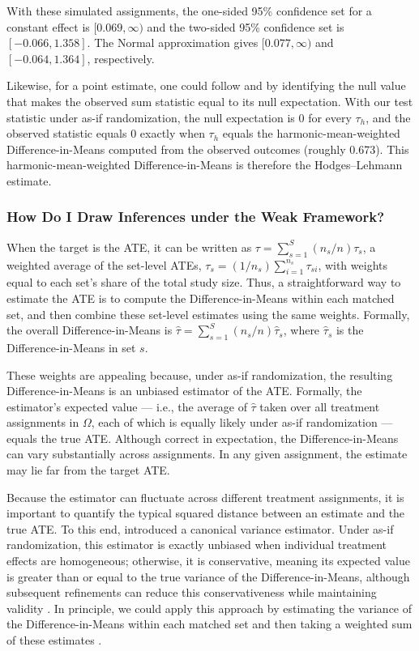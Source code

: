\documentclass[
  12pt,
  leqno]{article}
\begin{document}
\doublespacing

With these simulated assignments, the one-sided 95\% confidence set for
a constant effect is \([0.069, \infty)\) and the two-sided 95\%
confidence set is \([-0.066, 1.358]\). The Normal approximation gives
\([0.077, \infty)\) and \([-0.064, 1.364]\), respectively.

Likewise, for a point estimate, one could follow
\citet{hodgeslehmann1963} and \citet{rosenbaum1993} by identifying the
null value that makes the observed sum statistic equal to its null
expectation. With our test statistic under as-if randomization, the null
expectation is \(0\) for every \(\tau_h\), and the observed statistic
equals \(0\) exactly when \(\tau_h\) equals the harmonic-mean-weighted
Difference-in-Means computed from the observed outcomes (roughly 0.673).
This harmonic-mean-weighted Difference-in-Means is therefore the
Hodges--Lehmann estimate.

\subsubsection{How Do I Draw Inferences under the Weak
Framework?}\label{how-do-i-draw-inferences-under-the-weak-framework}

When the target is the ATE, it can be written as
\(\tau = \sum_{s = 1}^S (n_s / n)\tau_s\), a weighted average of the
set-level ATEs, \(\tau_s = (1/n_s)\sum_{i=1}^{n_s}\tau_{si}\), with
weights equal to each set's share of the total study size. Thus, a
straightforward way to estimate the ATE is to compute the
Difference-in-Means within each matched set, and then combine these
set-level estimates using the same weights. Formally, the overall
Difference-in-Means is
\(\hat{\tau} = \sum_{s=1}^S (n_s / n) \hat{\tau}_s\), where
\(\hat{\tau}_s\) is the Difference-in-Means in set \(s\).

These weights are appealing because, under as-if randomization, the
resulting Difference-in-Means is an unbiased estimator of the ATE.
Formally, the estimator's expected value --- i.e., the average of
\(\hat{\tau}\) taken over all treatment assignments in \(\Omega\), each
of which is equally likely under as-if randomization --- equals the true
ATE. Although correct in expectation, the Difference-in-Means can vary
substantially across assignments. In any given assignment, the estimate
may lie far from the target ATE.

Because the estimator can fluctuate across different treatment
assignments, it is important to quantify the typical squared distance
between an estimate and the true ATE. To this end, \citet{neyman1923}
introduced a canonical variance estimator. Under as-if randomization,
this estimator is exactly unbiased when individual treatment effects are
homogeneous; otherwise, it is conservative, meaning its expected value
is greater than or equal to the true variance of the
Difference-in-Means, although subsequent refinements can reduce this
conservativeness while maintaining validity
\citep[see][]{robins1988, aronowetal2014, harshawetal2024}. In
principle, we could apply this approach by estimating the variance of
the Difference-in-Means within each matched set and then taking a
weighted sum of these estimates \citep[see, e.g.,][]{miratrixetal2013}.
\end{document}
